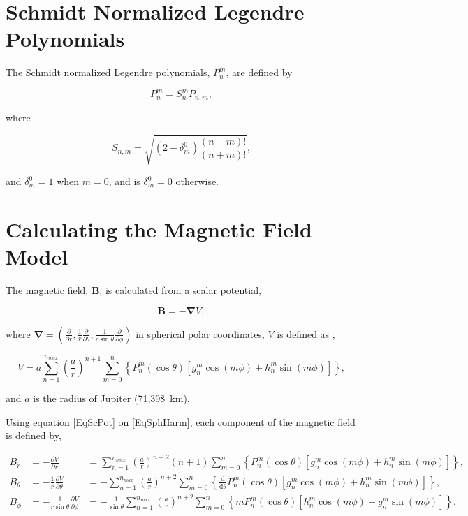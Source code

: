 \documentclass[]{article}
\begin{document}
\section{Schmidt Normalized Legendre Polynomials}
	
	The Schmidt normalized Legendre polynomials, $P_n^m$, are defined by
	
	\begin{equation}
		P_n^m = S_n^m P_{n,m},
	\end{equation}
	
	where 
	
	\begin{equation}
		S_{n,m} = \sqrt{(2-\delta_m^0)\frac{(n-m)!}{(n+m)!}},
	\end{equation}
	
	and $\delta_m^0 = 1$ when $m = 0$, and is $\delta_m^0 = 0$ otherwise.
	
\section{Calculating the Magnetic Field Model}

	The magnetic field, $\mathbf{B}$, is calculated from a scalar potential,
	
	\begin{equation}
		\mathbf{B} = -\mathbf{\nabla} V, \label{EqScPot}
	\end{equation}
	
	where $\mathbf{\nabla} = \left(\frac{\partial}{\partial r},\frac{1}{r}\frac{\partial}{\partial \theta},\frac{1}{r \sin{\theta}} \frac{\partial}{\partial \phi} \right) $ in spherical polar coordinates, $V$ is defined as \cite[e.g.][]{Connerney1998,Winch2005},
	
	\begin{equation}
		V = a\sum_{n=1}^{n_{max}} \left(\frac{a}{r}\right)^{n+1} \sum_{m=0}^{n} \left\{P_n^m(\cos{\theta}) \left[g_n^m \cos{(m\phi)} + h_n^m\sin{(m\phi)}\right]\right\}, \label{EqSphHarm}
	\end{equation}
	
	and $a$ is the radius of Jupiter (71,398~km).
	
	Using equation \ref{EqScPot} on \ref{EqSphHarm}, each component of the magnetic field is defined by,
	
	\begin{align}
		B_r &= -\frac{\partial V}{\partial r} &= \sum_{n=1}^{n_{max}} \left(\frac{a}{r}\right)^{n+2} (n+1) \sum_{m=0}^{n} \left\{P_n^m(\cos{\theta}) \left[g_n^m \cos{(m\phi)} + h_n^m\sin{(m\phi)}\right]\right\}, \\
		B_\theta &= -\frac{1}{r}\frac{\partial V}{\partial \theta} &= -\sum_{n=1}^{n_{max}} \left(\frac{a}{r}\right)^{n+2} \sum_{m=0}^{n} \left\{\frac{\text{d}}{\text{d}\theta} P_n^m(\cos{\theta}) \left[g_n^m \cos{(m\phi)} + h_n^m\sin{(m\phi)}\right]\right\}, \\
		B_\phi &= -\frac{1}{r\sin{\theta}}\frac{\partial V}{\partial \phi} &= -\frac{1}{\sin{\theta}}\sum_{n=1}^{n_{max}} \left(\frac{a}{r}\right)^{n+2} \sum_{m=0}^{n} \left\{mP_n^m(\cos{\theta}) \left[h_n^m \cos{(m\phi)} - g_n^m\sin{(m\phi)}\right]\right\}.
	\end{align}
	
\end{document}
